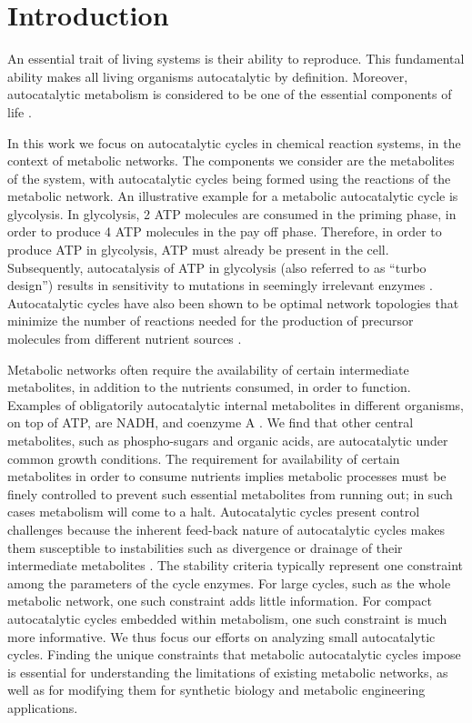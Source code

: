 \section{Introduction}
    An essential trait of living systems is their ability to reproduce.
    This fundamental ability makes all living organisms autocatalytic by definition.
    Moreover, autocatalytic metabolism is considered to be one of the essential components of life \cite{Ganti2003-ch}.

    In this work we focus on autocatalytic cycles in chemical reaction systems, in the context of metabolic networks.
    The components we consider are the metabolites of the system, with autocatalytic cycles being formed using the reactions of the metabolic network.
    An illustrative example for a metabolic autocatalytic cycle is glycolysis.
    In glycolysis, 2 ATP molecules are consumed in the priming phase, in order to produce 4 ATP molecules in the pay off phase.
    Therefore, in order to produce ATP in glycolysis, ATP must already be present in the cell.
    Subsequently, autocatalysis of ATP in glycolysis (also referred to as ``turbo design'') results in sensitivity to mutations in seemingly irrelevant enzymes \cite{Teusink1998-he}.
    Autocatalytic cycles have also been shown to be optimal network topologies that minimize the number of reactions needed for the production of precursor molecules from different nutrient sources \cite{Riehl2010-yh}.

    Metabolic networks often require the availability of certain intermediate metabolites, in addition to the nutrients consumed, in order to function.
    Examples of obligatorily autocatalytic internal metabolites in different organisms, on top of ATP, are NADH, and coenzyme A \cite{Kun2008-xg}.
    We find that other central metabolites, such as phospho-sugars and organic acids, are autocatalytic under common growth conditions.
    The requirement for availability of certain metabolites in order to consume nutrients implies metabolic processes must be finely controlled to prevent such essential metabolites from running out; in such cases metabolism will come to a halt.
    Autocatalytic cycles present control challenges because the inherent feed-back nature of autocatalytic cycles makes them susceptible to instabilities such as divergence or drainage of their intermediate metabolites \cite{Teusink1998-he,Fell1999,Reznik2010-te}.
    The stability criteria typically represent one constraint among the parameters of the cycle enzymes.
    For large cycles, such as the whole metabolic network, one such constraint adds little information.
    For compact autocatalytic cycles embedded within metabolism, one such constraint is much more informative.
    We thus focus our efforts on analyzing small autocatalytic cycles.
    Finding the unique constraints that metabolic autocatalytic cycles impose is essential for understanding the limitations of existing metabolic networks, as well as for modifying them for synthetic biology and metabolic engineering applications.

